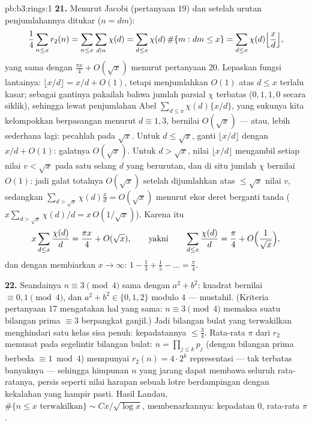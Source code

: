 \begin{solution}{pb:b3:rings:1}
\textbf{21.} Menurut Jacobi (pertanyaan 19) dan setelah urutan
penjumlahannya ditukar ($n = dm$):
\[
\frac14\sum_{n\leq x}r_2(n) = \sum_{n \leq x}\sum_{d \mid
n}\chi(d) = \sum_{d \leq x}\chi(d)\,\#\{m : dm \leq x\}
= \sum_{d\leq x}\chi(d)\Bigl\lfloor\frac xd\Bigr\rfloor,
\]
yang sama dengan $\frac{\pi x}4 + O(\sqrt x)$ menurut pertanyaan 20. Lepaskan
fungsi lantainya: $\lfloor x/d\rfloor = x/d + O(1)$, tetapi menjumlahkan
$O(1)$ atas $d \leq x$ terlalu kasar; sebagai gantinya pakailah bahwa
jumlah parsial $\chi$ terbatas ($0, 1, 1, 0$ secara siklik),
sehingga lewat penjumlahan Abel $\sum_{d\leq x}\chi(d)\{x/d\}$, yang
sukunya kita kelompokkan berpasangan menurut $d \equiv 1, 3$, bernilai $O(\sqrt x)$ ---
atau, lebih sederhana lagi: pecahlah pada $\sqrt x$. Untuk $d \leq
\sqrt x$, ganti $\lfloor x/d\rfloor$ dengan $x/d + O(1)$: galatnya
$O(\sqrt x)$. Untuk $d > \sqrt x$, nilai $\lfloor x/d\rfloor$ mengambil
setiap nilai $v < \sqrt x$ pada satu selang $d$ yang berurutan,
dan di situ jumlah $\chi$ bernilai $O(1)$: jadi galat totalnya $O(\sqrt x)$ setelah
dijumlahkan atas $\leq \sqrt x$ nilai $v$, sedangkan
$\sum_{d > \sqrt x}\chi(d)\frac xd = O(\sqrt x)$ menurut
ekor deret berganti tanda ($x\sum_{d>\sqrt x}\chi(d)/d =
x\,O(1/\sqrt x)$). Karena itu
\[
x\sum_{d \leq x}\frac{\chi(d)}d = \frac{\pi x}4 + O(\sqrt x),
\qquad\text{yakni}\qquad
\sum_{d\leq x}\frac{\chi(d)}d = \frac\pi4 +
O\Bigl(\frac1{\sqrt x}\Bigr),
\]
dan dengan membiarkan $x \to \infty$: $1 - \frac13 + \frac15 - \dots =
\frac\pi4$.

\textbf{22.} Seandainya $n \equiv 3 \pmod4$ sama dengan $a^2 + b^2$: kuadrat
bernilai $\equiv 0, 1 \pmod 4$, dan $a^2 + b^2 \in \{0, 1, 2\}$
modulo $4$ --- mustahil. (Kriteria pertanyaan 17 mengatakan hal yang
sama: $n \equiv 3 \pmod 4$ memaksa suatu bilangan prima $\equiv 3$ berpangkat
ganjil.) Jadi bilangan bulat yang terwakilkan menghindari satu kelas sisa
penuh: kepadatannya $\leq \frac34$. Rata-rata $\pi$ dari $r_2$
memusat pada segelintir bilangan bulat: $n = \prod_{j\leq k}p_j$
(dengan bilangan prima berbeda $\equiv 1 \bmod 4$) mempunyai $r_2(n) = 4\cdot2^k$
representasi --- tak terbatas banyaknya --- sehingga himpunan $n$ yang
jarang dapat membawa seluruh rata-ratanya, persis seperti nilai harapan
sebuah lotre berdampingan dengan kekalahan yang hampir pasti. Hasil Landau,
$\#\{n \leq x \text{ terwakilkan}\} \sim
Cx/\sqrt{\log x}$, membenarkannya: kepadatan $0$, rata-rata $\pi$.


\end{solution}
